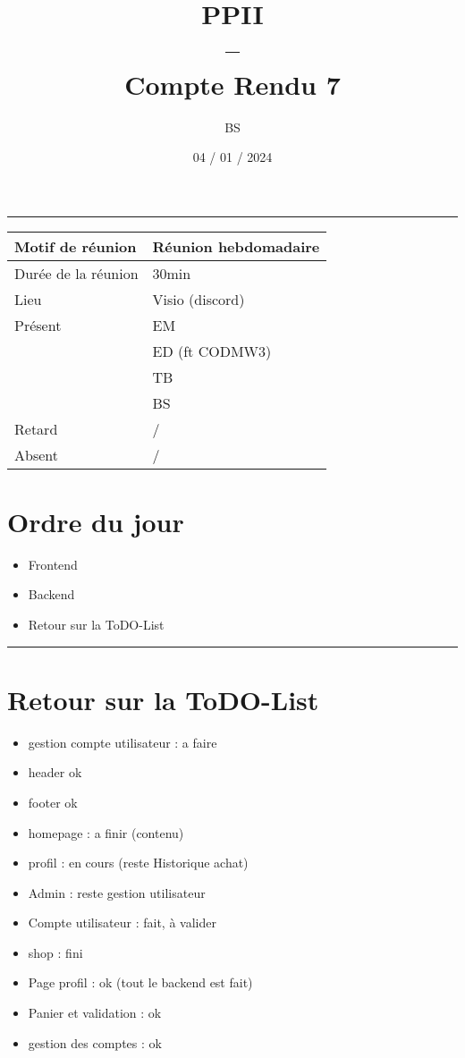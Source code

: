 \documentclass[10pt,a4paper]{report}
\title{PPII \\ -- \\ Compte Rendu 7}
\date{04 / 01 / 2024}
\author{BS}
\begin{document}
\maketitle

\tableofcontents \bigskip

\noindent\rule{\linewidth}{0.5mm} \bigskip

                \begin{tabular}{|l | l|}
                        \hline
                Motif de réunion & Réunion hebdomadaire \\
                        \hline
                Durée de la réunion & 30min \\
                        \hline
                Lieu & Visio (discord) \\
                        \hline
                Présent & EM \\
                        & ED (ft CODMW3)\\
                        & TB  \\
                        & BS \\
                        \hline
                Retard  & / \\
                        \hline
                Absent  & / \\
                        \hline
                \end{tabular}


\section{Ordre du jour}
\begin{itemize}
        \item Frontend
        \item Backend
        \item Retour sur la ToDO-List
\end{itemize}

\noindent\rule{\linewidth}{0.5mm} \bigskip
\section{Retour sur la ToDO-List}
\begin{itemize}
        \item gestion compte utilisateur : a faire
        \item header ok
        \item footer ok
        \item homepage : a finir (contenu)
        \item profil : en cours (reste Historique achat)
        \item Admin : reste gestion utilisateur
        \\
        \item Compte utilisateur : fait, à valider
        \item shop : fini
        \item Page profil : ok (tout le backend est fait)
        \item Panier et validation : ok
        \item gestion des comptes : ok 
\end{itemize}
\end{document}
